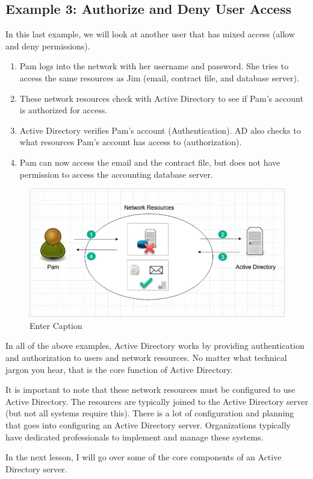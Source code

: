 \subsection{Example 3: Authorize and Deny User Access}
In this last example, we will look at another user that has mixed access (allow and deny permissions).
\begin{enumerate}
    \item Pam logs into the network with her username and password. She tries to access the same resources as Jim (email, contract file, and database server).
    \item These network resources check with Active Directory to see if Pam’s account is authorized for access.
    \item Active Directory verifies Pam’s account (Authentication). AD also checks to what resources Pam's account has access to (authorization).
    \item Pam can now access the email and the contract file, but does not have permission to access the accounting database server.
\end{enumerate}
\begin{figure}
    \centering
    \includegraphics[width=0.75\linewidth]{auth2.png}
    \caption{Enter Caption}
    \label{fig:placeholder}
\end{figure}
In all of the above examples, Active Directory works by providing authentication and authorization to users and network resources. No matter what technical jargon you hear, that is the core function of Active Directory.

It is important to note that these network resources must be configured to use Active Directory. The resources are typically joined to the Active Directory server (but not all systems require this). There is a lot of configuration and planning that goes into configuring an Active Directory server. Organizations typically have dedicated professionals to implement and manage these systems.

In the next lesson, I will go over some of the core components of an Active Directory server.


